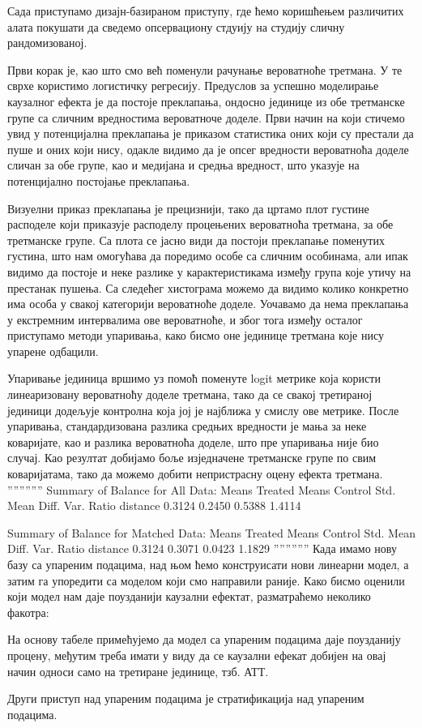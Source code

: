\documentclass[12pt, a4paper]{article}
\begin{document}
Сада приступамо дизајн-базираном приступу, где ћемо коришћењем различитих алата покушати да сведемо опсервациону стдуију на студију сличну рандомизованој.

Први корак је, као што смо већ поменули рачунање вероватноће третмана. У те сврхе користимо логистичку регресију. Предуслов за успешно моделирање каузалног ефекта је да постоје преклапања, ондосно јединице из обе третманске групе са сличним вредностима вероватноче доделе. Први начин на који стичемо увид у потенцијална преклапања је приказом статистика оних који су престали да пуше и оних који нису, одакле видимо да је опсег вредности вероватноћа доделе сличан за обе групе, као и медијана и средња вредност, што указује на потенцијално постојање преклапања.  

Визуелни приказ преклапања је прецизнији, тако да цртамо плот густине расподеле који приказује расподелу процењених вероватноћа третмана, за обе третманске групе. Са плота се јасно види да постоји преклапање поменутих густина, што нам омогућава да поредимо особе са сличним особинама, али ипак видимо да постоје и неке разлике у карактеристикама између група које утичу на престанак пушења. Са следећег хистограма можемо да видимо колико конкретно има особа у свакој категорији вероватноће доделе. Уочавамо да нема преклапања у екстремним интервалима ове вероватноће, и због тога између осталог приступамо методи упаривања, како бисмо оне јединице третмана које нису упарене одбацили. 

Упаривање јединица вршимо уз помоћ поменуте logit метрике која користи линеаризовану вероватноћу доделе третмана, тако да се свакој третираној јединици додељује контролна која јој је најближа у смислу ове метрике. После упаривања, стандардизована разлика средњих вредности је мања за неке коваријате, као и разлика вероватноћа доделе, што пре упаривања није био случај. Као резултат добијамо боље изједначене третманске групе по свим коваријатама, тако да можемо добити непристрасну оцену ефекта третмана.
''''''''''''
Summary of Balance for All Data:
                                   Means Treated Means Control Std. Mean Diff. Var. Ratio
distance                                  0.3124        0.2450          0.5388     1.4114

Summary of Balance for Matched Data:
                                   Means Treated Means Control Std. Mean Diff. Var. Ratio
distance                                  0.3124        0.3071          0.0423     1.1829
''''''''''''
Када имамо нову базу са упареним подацима, над њом ћемо конструисати нови линеарни модел, а затим га упоредити са моделом који смо направили раније. Како бисмо оценили који модел нам даје поузданији каузални ефектат, разматраћемо неколико факотра:





На основу табеле примећујемо да модел са упареним подацима даје поузданију процену, међутим треба имати у виду да се каузални ефекат добијен на овај начин односи само на третиране јединице, тзб. АТТ.

Други приступ над упареним подацима је стратификација над упареним подацима.
\end{document}
